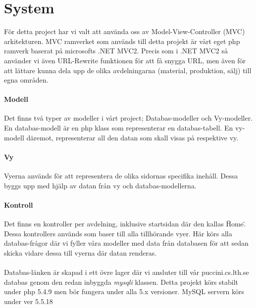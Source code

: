 \section{System}

För detta project har vi valt att använda oss av Model-View-Controller (MVC) arkitekturen.
MVC ramverket som används till detta projekt är vårt eget php ramverk baserat på microsofts .NET MVC2.
Precis som i .NET MVC2 så använder vi även URL-Rewrite funktionen för att få snygga URL, men även för att lättare kunna dela upp de olika avdelningarna (material, produktion, sälj) till egna områden.

\paragraph{Modell}
Det finns två typer av modeller i vårt project; Databas-modeller och Vy-modeller.
En databas-modell är en php klass som representerar en databas-tabell.
En vy-modell däremot, representerar all den datan som skall visas på respektive vy.

\paragraph{Vy}
Vyerna används för att representera de olika sidornas specifika inehåll. Dessa byggs upp med hjälp av datan från vy och databas-modellerna.

\paragraph{Kontroll}
Det finns en kontroller per avdelning, inklusive startsidan där den kallas \"Home\". Dessa kontrollers används som baser till alla tillhörande vyer.
Här körs alla databas-frågor där vi fyller våra modeller med data från databasen för att sedan skicka vidare dessa till vyerna där datan renderas.\\
\\
Databas-länken är skapad i ett övre lager där vi ansluter till vår puccini.cs.lth.se databas genom den redan inbyggda \textit{mysqli} klassen.
Detta projekt körs stabilt under php 5.4.9 men bör fungera under alla 5.x versioner.
MySQL servern körs under ver 5.5.18
